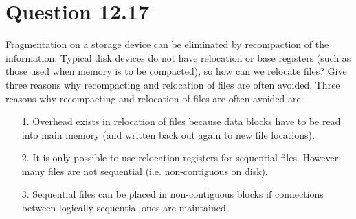 \documentclass[12pt]{article}
\begin{document}
\section*{Question 12.17} {\color{blue}  Fragmentation on a storage device can be eliminated by recompaction of the information. Typical disk devices do not have relocation or base registers (such as those used when memory is to be compacted), so how can we relocate files? Give three reasons why recompacting and relocation of files are often avoided.}
Three reasons why recompacting and relocation of files are often avoided are:
\begin{enumerate}

\item[1.]Overhead exists in relocation of files because data blocks have to be read into main memory (and written back out again to new file locations). 
\item[2.]It is only possible to use relocation registers for sequential files. However, many files are not sequential (i.e. non-contiguous on disk).
\item[3.]Sequential files can be placed in non-contiguous blocks if connections between logically sequential ones are maintained.
\end{enumerate}
\end{document}
